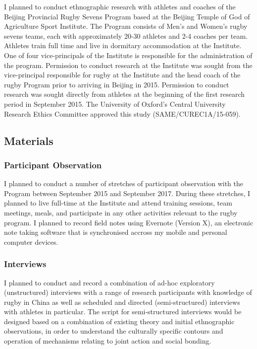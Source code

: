 I planned to conduct ethnographic research with athletes and coaches of the Beijing Provincial Rugby Sevens Program based at the Beijing Temple of God of Agriculture Sport Institute.  The Program consists of Men's and Women's rugby sevens teams, each with approximately 20-30 athletes and 2-4 coaches per team. Athletes train full time and live in dormitary accommodation at the Institute.  One of four vice-principals of the Institute is responsible for the administration of the program.  Permission to conduct research at the Institute was sought from the vice-principal responsible for rugby at the Institute and the head coach of the rugby Program prior to arriving in Beijing in 2015.  Permission to conduct research was sought directly from athletes at the beginning of the first research period in September 2015. The University of Oxford’s Central University Research Ethics Committee approved this study (SAME/CUREC1A/15-059).

\subsection{Materials}

  \subsubsection{Participant Observation}
  I planned to conduct a number of stretches of participant observation with the Program between September 2015 and September 2017.  During these stretches, I planned to live full-time at the Institute and attend training sessions, team meetings, meals, and participate in any other activities relevant to the rugby program.  I planned to record field notes using Evernote (Version X), an electronic note taking software that is synchronised accross my mobile and personal computer devices.

  \subsubsection{Interviews}
  I planned to conduct and record a combination of ad-hoc exploratory (unstructured) interviews with a range of research participants with knowledge of rugby in China as well as scheduled and directed (semi-structured) interviews with athletes in particular.  The script for semi-structured interviews would be designed based on a combination of existing theory and initial ethnographic observations, in order to understand the culturally specific contours and operation of mechanisms relating to joint action and social bonding.

